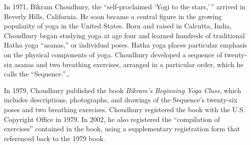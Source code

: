 In 1971, Bikram Choudhury, the ``self-proclaimed `Yogi to the stars,'\,''
arrived in Beverly Hills, California. He soon became a central
figure in the growing popularity of yoga in the United States. Born and
raised in Calcutta, India, Choudhury began studying yoga at age four and
learned hundreds of traditional Hatha yoga ``asanas,'' or individual
poses. Hatha yoga places particular emphasis on the physical components
of yoga. Choudhury developed a sequence of twenty-six asanas and two
breathing exercises, arranged in a particular order, which he calls the
``Sequence.''\ldots
%

In 1979, Choudhury published the book \textit{Bikram's Beginning Yoga Class},
which includes descriptions, photographs, and drawings of the
Sequence's twenty-six poses and two breathing exercises. Choudhury
registered the book with the U.S. Copyright Office in 1979. In 2002, he
also registered the ``compilation of exercises'' contained in the book,
using a supplementary  registration form that referenced back to the 1979 book.

